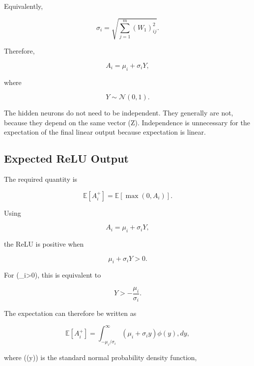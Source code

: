 \documentclass[12pt,a4paper]{report}
\begin{document}
Equivalently,

\begin{equation}
\sigma_i
=
\sqrt{
\sum_{j=1}^{m}
(W_1)_{ij}^{2}
}.
\end{equation}

Therefore,

\begin{equation}
A_i
=
\mu_i+\sigma_iY,
\end{equation}

where

\begin{equation}
Y
\sim
\mathcal{N}(0,1).
\end{equation}

The hidden neurons do not need to be independent. They generally are not, because they depend on the same vector (Z). Independence is unnecessary for the expectation of the final linear output because expectation is linear.

\subsection{Expected ReLU Output}

The required quantity is

\begin{equation}
\mathbb{E}[A_i^+]
=
\mathbb{E}
\left[
\max(0,A_i)
\right].
\end{equation}

Using

\begin{equation}
A_i
=
\mu_i+\sigma_iY,
\end{equation}

the ReLU is positive when

\begin{equation}
\mu_i+\sigma_iY>0.
\end{equation}

For (\sigma_i>0), this is equivalent to

\begin{equation}
Y
>
-\frac{\mu_i}{\sigma_i}.
\end{equation}

The expectation can therefore be written as

\begin{equation}
\mathbb{E}[A_i^+]
=
\int_{-\mu_i/\sigma_i}^{\infty}
(\mu_i+\sigma_i y)
\phi(y)
,dy,
\end{equation}

where (\phi(y)) is the standard normal probability density function,
\end{document}
